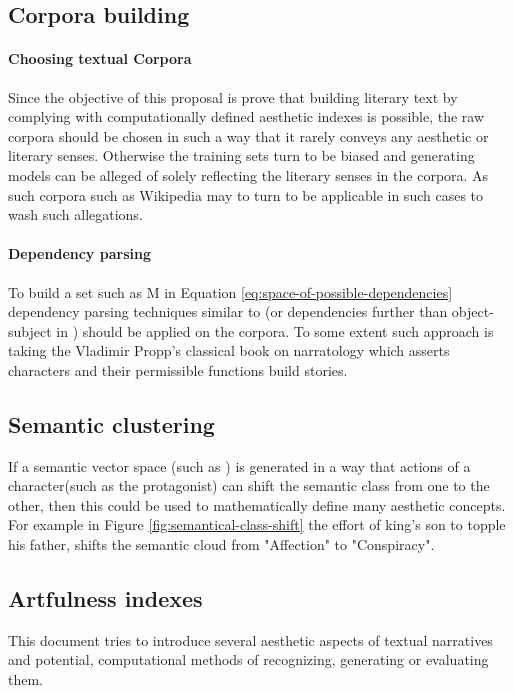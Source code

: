 \documentclass{article}
\begin{document}
		\subsection{Corpora building}
			\paragraph{Choosing textual Corpora} Since the objective of this proposal is prove that building literary text by complying with computationally defined aesthetic indexes is possible, the raw corpora should be chosen in such a way that it rarely conveys any aesthetic or literary senses. Otherwise the training sets turn to be biased and generating models can be alleged of solely reflecting the literary senses in the corpora. As such corpora such as Wikipedia may to turn to be applicable in such cases to wash such allegations.  
			\paragraph{Dependency parsing} To build a set such as M in Equation \ref{eq:space-of-possible-dependencies} dependency parsing techniques similar to \cite{de-marneffe-2014-universal-stanford-dependencies-a-cross-linguistic-typology} (or dependencies further than object-subject in \cite{nivre-2016-universal-dependencies-v1-a-multilingual-treebank-collection}) should be applied on the corpora. To some extent such approach is taking the Vladimir Propp's classical book on narratology \citep{propp-1968-morphology-of-the-folk-tale} which asserts characters and their permissible functions build stories. 
		
		\subsection{Semantic clustering} \label{sec:applications-of-semantic-classiication}
		 If a semantic vector space (such as \cite{mikolov-2013-distributed-representations-of-words-and-phrases-and-their-compositionality}) is generated in a  way that actions of a character(such as the protagonist) can shift the semantic class from one to the other, then  this could be used to mathematically define many aesthetic concepts. For example in Figure \ref{fig:semantical-class-shift} the effort of king's son to topple his father, shifts the semantic cloud from "Affection" to "Conspiracy". 
			
		
		\subsection{Artfulness indexes} \label{sec:artfulness-indexes}
		This document tries to introduce several aesthetic aspects of textual narratives and potential, computational methods of recognizing, generating or evaluating them. 
		
\end{document}
